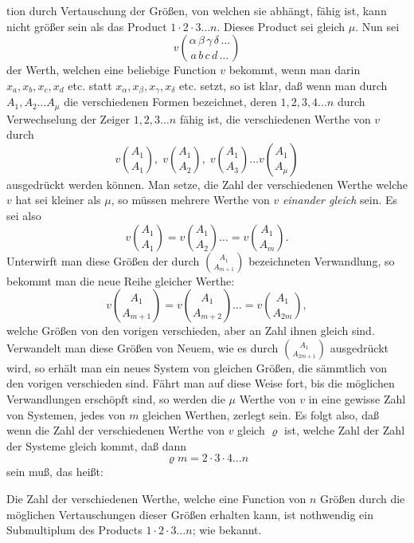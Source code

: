 \documentclass{article}
\begin{document}
tion durch Vertauschung der Größen, von welchen sie abhängt, fähig ist, kann nicht größer sein als das Product $1 \cdot 2 \cdot 3 \ldots n$. Dieses Product sei gleich $\mu$. Nun sei
\[ v\binom{\alpha\,\beta\,\gamma\,\delta\,\ldots}{a\,b\,c\,d\,\ldots} \]
der Werth, welchen eine beliebige Function $v$ bekommt, wenn man darin $x_a, x_b, x_c, x_d$ etc. statt $x_\alpha, x_\beta, x_\gamma, x_\delta$ etc. setzt, so ist klar, daß wenn man durch $A_1, A_2 \ldots A_\mu$ die verschiedenen Formen bezeichnet, deren $1, 2, 3, 4 \ldots n$ durch Verwechselung der Zeiger $1, 2, 3 \ldots n$ fähig ist, die verschiedenen Werthe von $v$ durch
\[ v\binom{A_1}{A_1}, \; v\binom{A_1}{A_2}, \; v\binom{A_1}{A_3} \ldots v\binom{A_1}{A_\mu} \]
ausgedrückt werden können. Man setze, die Zahl der verschiedenen Werthe welche $v$ hat sei kleiner als $\mu$, so müssen mehrere Werthe von $v$ \emph{einander gleich} sein. Es sei also
\[ v\binom{A_1}{A_1} = v\binom{A_1}{A_2} \ldots = v\binom{A_1}{A_m}. \]
Unterwirft man diese Größen der durch $\binom{A_1}{A_{m+1}}$ bezeichneten Verwandlung, so bekommt man die neue Reihe gleicher Werthe:
\[ v\binom{A_1}{A_{m+1}} = v\binom{A_1}{A_{m+2}} \ldots = v\binom{A_1}{A_{2m}}, \]
welche Größen von den vorigen verschieden, aber an Zahl ihnen gleich sind. Verwandelt man diese Größen von Neuem, wie es durch $\binom{A_1}{A_{2m+1}}$ ausgedrückt wird, so erhält man ein neues System von gleichen Größen, die sämmtlich von den vorigen verschieden sind. Fährt man auf diese Weise fort, bis die möglichen Verwandlungen erschöpft sind, so werden die $\mu$ Werthe von $v$ in eine gewisse Zahl von Systemen, jedes von $m$ gleichen Werthen, zerlegt sein. Es folgt also, daß wenn die Zahl der verschiedenen Werthe von $v$ gleich $\varrho$ ist, welche Zahl der Zahl der Systeme gleich kommt, daß dann
\[ \varrho m = 2 \cdot 3 \cdot 4 \ldots n \]
sein muß, das heißt:

Die Zahl der verschiedenen Werthe, welche eine Function von $n$ Größen durch die möglichen Vertauschungen dieser Größen erhalten kann, ist nothwendig ein Submultiplum des Products $1 \cdot 2 \cdot 3 \ldots n$; wie bekannt.
\end{document}
